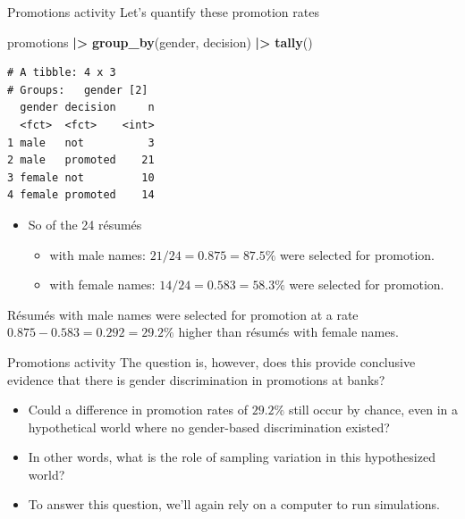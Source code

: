 \documentclass[
  ignorenonframetext,
]{beamer}
\newenvironment{Shaded}{\begin{snugshade}}{\end{snugshade}}
\newcommand{\FunctionTok}[1]{\textcolor[rgb]{0.13,0.29,0.53}{\textbf{#1}}}
\newcommand{\NormalTok}[1]{#1}
\newcommand{\SpecialCharTok}[1]{\textcolor[rgb]{0.81,0.36,0.00}{\textbf{#1}}}
\providecommand{\tightlist}{%
  \setlength{\itemsep}{0pt}\setlength{\parskip}{0pt}}
\begin{document}
\begin{frame}[fragile]{Promotions activity}
\label{promotions-activity-4}
Let's quantify these promotion rates

\tiny

\begin{Shaded}
\begin{Highlighting}[]
\NormalTok{promotions }\SpecialCharTok{|\textgreater{}} 
  \FunctionTok{group\_by}\NormalTok{(gender, decision) }\SpecialCharTok{|\textgreater{}} 
  \FunctionTok{tally}\NormalTok{()}
\end{Highlighting}
\end{Shaded}

\begin{verbatim}
# A tibble: 4 x 3
# Groups:   gender [2]
  gender decision     n
  <fct>  <fct>    <int>
1 male   not          3
2 male   promoted    21
3 female not         10
4 female promoted    14
\end{verbatim}

\normalsize

\begin{itemize}
\item
  So of the 24 résumés

  \begin{itemize}
  \tightlist
  \item
    with male names: \(21/24=0.875=87.5\%\) were selected for promotion.
  \item
    with female names: \(14/24=0.583=58.3\%\) were selected for
    promotion.
  \end{itemize}
\end{itemize}

Résumés with male names were selected for promotion at a rate
\(0.875 -0.583 = 0.292 = 29.2\%\) higher than résumés with female names.
\end{frame}

\begin{frame}{Promotions activity}
\label{promotions-activity-5}
The question is, however, does this provide conclusive evidence that
there is gender discrimination in promotions at banks?

\begin{itemize}
\item
  Could a difference in promotion rates of \(29.2\%\) still occur by
  chance, even in a hypothetical world where no gender-based
  discrimination existed?
\item
  In other words, what is the role of sampling variation in this
  hypothesized world?
\item
  To answer this question, we'll again rely on a computer to run
  simulations.
\end{itemize}
\end{frame}
\end{document}
